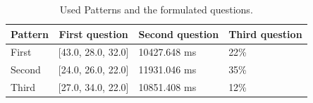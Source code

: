 \documentclass[sigconf]{acmart}
\begin{document}
\begin{table}[h]
\centering
\caption{Used Patterns and the formulated questions.}
\label{my-label}
\begin{tabular}{|l|l|l|l|}
\hline
Pattern & \multicolumn{1}{c|}{\textbf{First question}} & \multicolumn{1}{c|}{\textbf{Second question}} & \multicolumn{1}{c|}{\textbf{Third question}} \\ \hline
First   &  [43.0, 28.0, 32.0] 						  &				10427.648 ms		  			  &		22\%                          \\ \hline
Second  &  [24.0, 26.0, 22.0]              			  &  			11931.046 ms                      &     35\%                           \\ \hline
Third   &  [27.0, 34.0, 22.0]                         &       		10851.408 ms                      &     12\%                            \\ \hline
\end{tabular}
\end{table}
\end{document}
